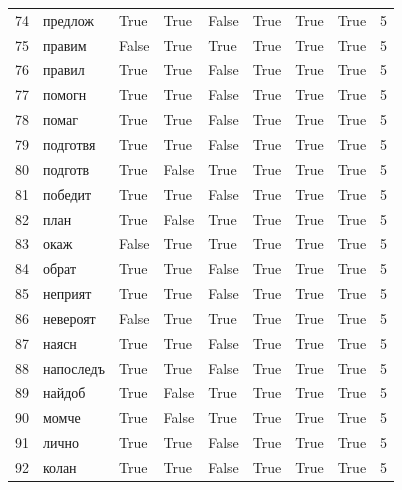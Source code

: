 \begin{longtable}{rlllllllr}
  74 &     предлож &     True &   True &  False &       True &           True &      True &      5 \\
  75 &      правим &    False &   True &   True &       True &           True &      True &      5 \\
  76 &      правил &     True &   True &  False &       True &           True &      True &      5 \\
  77 &      помогн &     True &   True &  False &       True &           True &      True &      5 \\
  78 &       помаг &     True &   True &  False &       True &           True &      True &      5 \\
  79 &    подготвя &     True &   True &  False &       True &           True &      True &      5 \\
  80 &     подготв &     True &  False &   True &       True &           True &      True &      5 \\
  81 &     победит &     True &   True &  False &       True &           True &      True &      5 \\
  82 &        план &     True &  False &   True &       True &           True &      True &      5 \\
  83 &        окаж &    False &   True &   True &       True &           True &      True &      5 \\
  84 &       обрат &     True &   True &  False &       True &           True &      True &      5 \\
  85 &     неприят &     True &   True &  False &       True &           True &      True &      5 \\
  86 &    невероят &    False &   True &   True &       True &           True &      True &      5 \\
  87 &       наясн &     True &   True &  False &       True &           True &      True &      5 \\
  88 &   напоследъ &     True &   True &  False &       True &           True &      True &      5 \\
  89 &      найдоб &     True &  False &   True &       True &           True &      True &      5 \\
  90 &       момче &     True &  False &   True &       True &           True &      True &      5 \\
  91 &       лично &     True &   True &  False &       True &           True &      True &      5 \\
  92 &       колан &     True &   True &  False &       True &           True &      True &      5 \\

\end{longtable}
